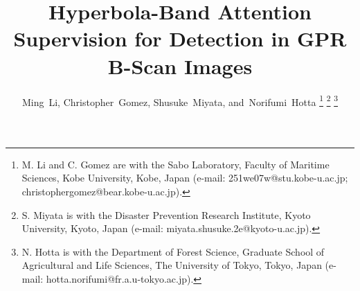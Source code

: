 \documentclass[lettersize,journal]{IEEEtran}
\begin{document}
\title{Hyperbola-Band Attention Supervision for Detection in GPR B-Scan Images}


\author{Ming~Li, Christopher~Gomez, Shusuke~Miyata, and~Norifumi~Hotta
\thanks{M. Li and C. Gomez are with the Sabo Laboratory, Faculty of Maritime Sciences, Kobe University, Kobe, Japan (e-mail: 251we07w@stu.kobe-u.ac.jp; christophergomez@bear.kobe-u.ac.jp).}
\thanks{S. Miyata is with the Disaster Prevention Research Institute, Kyoto University, Kyoto, Japan (e-mail: miyata.shusuke.2e@kyoto-u.ac.jp).}
\thanks{N. Hotta is with the Department of Forest Science, Graduate School of Agricultural and Life Sciences, The University of Tokyo, Tokyo, Japan (e-mail: hotta.norifumi@fr.a.u-tokyo.ac.jp).}


}



\maketitle
\end{document}
